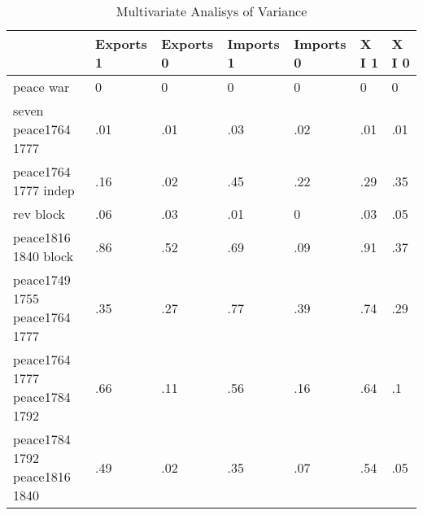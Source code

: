 \begin{table}[htbp]
\caption{\label{manova_test} Multivariate Analisys of Variance}\centering\medskip
\begin{tabular}{|l|l|l|l|l|l|l|}\hline  
 & Exports 1  & Exports 0  & Imports 1  & Imports 0  & X I 1  & X I 0  \\ \hline  
peace war & 0 & 0 & 0 & 0 & 0 & 0 \\ \hline 
seven peace1764 1777 & .01 & .01 & .03 & .02 & .01 & .01 \\ \hline 
peace1764 1777 indep & .16 & .02 & .45 & .22 & .29 & .35 \\ \hline 
rev block & .06 & .03 & .01 & 0 & .03 & .05 \\ \hline 
peace1816 1840 block & .86 & .52 & .69 & .09 & .91 & .37 \\ \hline 
peace1749 1755 peace1764 1777 & .35 & .27 & .77 & .39 & .74 & .29 \\ \hline 
peace1764 1777 peace1784 1792 & .66 & .11 & .56 & .16 & .64 & .1 \\ \hline 
peace1784 1792 peace1816 1840 & .49 & .02 & .35 & .07 & .54 & .05 \\ \hline 
  \end{tabular}
\end{table}
